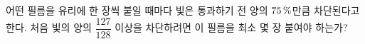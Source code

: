 어떤 필름을 유리에 한 장씩 붙일 때마다 빛은 통과하기 전 양의 $75\mkern3mu \%$만큼 차단된다고 한다. 처음 빛의 양의 $\dfrac{127}{128}$ 이상을 차단하려면 이 필름을 최소 몇 장 붙여야 하는가?
